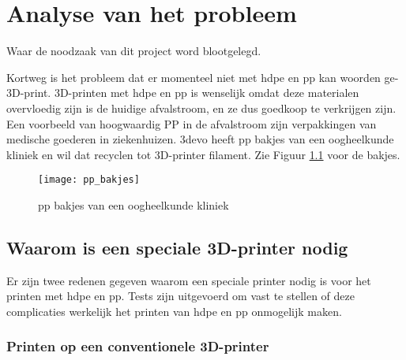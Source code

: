 \chapter{Analyse van het probleem}
\label{Analyse_van_het_probleem}

\begin{center}
    \begin{minipage}{0.5\textwidth}
        \begin{small}
            Waar de noodzaak van dit project word blootgelegd.
        \end{small} 
    \end{minipage}
    \vspace{0.5cm}
\end{center}

Kortweg is het probleem dat er momenteel niet met \ac{hdpe} en \ac{pp} kan
woorden ge-3D-print. 3D-printen met \ac{hdpe} en \ac{pp} is wenselijk omdat deze
materialen overvloedig zijn is de huidige afvalstroom, en ze dus goedkoop
te verkrijgen zijn.\\

Een voorbeeld van hoogwaardig PP in de afvalstroom zijn verpakkingen van
medische goederen in ziekenhuizen.  3devo heeft \ac{pp} bakjes van een
oogheelkunde kliniek en wil dat recyclen tot 3D-printer filament. Zie Figuur
\ref{fig:pp_bakjes} voor de bakjes.

\begin{figure}[h]
    \centerline{\texttt{[image: pp\_bakjes]}}
    \caption{\ac{pp} bakjes van een oogheelkunde kliniek}
    \label{fig:pp_bakjes}
\end{figure}

\section{Waarom is een speciale 3D-printer nodig}

Er zijn twee redenen gegeven waarom een speciale printer nodig is voor het
printen met \ac{hdpe} en \ac{pp}.  Tests zijn uitgevoerd om vast te stellen of
deze complicaties werkelijk het printen van \ac{hdpe} en \ac{pp} onmogelijk
maken.

\subsection{Printen op een conventionele 3D-printer}

